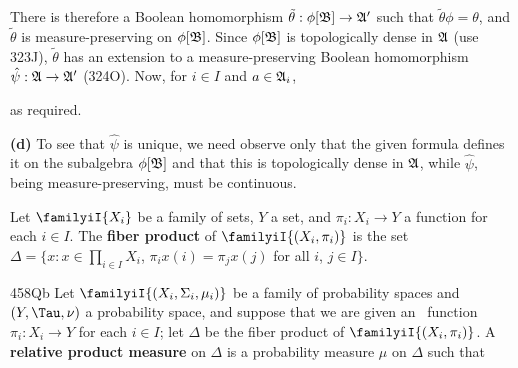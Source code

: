 {

\noindent There is therefore a Boolean homomorphism
$\tilde\theta:\phi[\frak B]\to\frak A'$ such that
$\tilde\theta\phi=\theta$, and $\tilde\theta$ is measure-preserving on
$\phi[\frak B]$.   Since $\phi[\frak B]$ is topologically dense in
$\frak A$ (use 323J), $\tilde\theta$ has an extension to a
measure-preserving Boolean homomorphism $\hat\psi:\frak A\to\frak A'$
(324O).   Now, for $i\in I$ and $a\in\frak A_i$,


\noindent as required.

\medskip

{\bf (d)} To see that $\hat\psi$ is unique, we need observe only that
the given formula defines it on the subalgebra $\phi[\frak B]$ and that
this is topologically dense in $\frak A$, while $\hat\psi$, being
measure-preserving, must be continuous.
}%

Let $\familyiI{X_i}$ be a family of sets, $Y$ a set, and
$\pi_i:X_i\to Y$ a function for each $i\in I$.   The {\bf fiber product}
of $\familyiI{(X_i,\pi_i)}$ is the set
$\Delta=\{x:x\in\prod_{i\in I}X_i$, $\pi_ix(i)=\pi_jx(j)$ for all $i$,
$j\in I\}$.

\spheader 458Qb  Let
$\familyiI{(X_i,\Sigma_i,\mu_i)}$ be a family of probability spaces
and $(Y,\Tau,\nu)$ a probability space, and suppose that we are given an
\imp\ function $\pi_i:X_i\to Y$ for each $i\in I$;  let $\Delta$ be the
fiber product of $\familyiI{(X_i,\pi_i)}$.   A {\bf relative
product measure} on $\Delta$ is a probability measure $\mu$ on $\Delta$
such that


